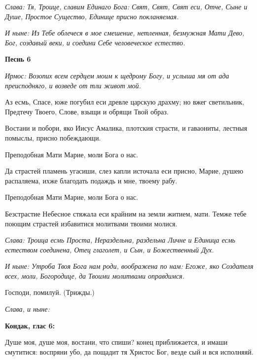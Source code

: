 \itshape Слава\normalfont{}: Тя, Троице, славим Единаго Бога: Свят, Свят, Свят еси, Отче, Сыне и Душе, Простое Существо, Единице присно покланяемая. 

\itshape И ныне\normalfont{}: Из Тебе облечеся в мое смешение, нетленная, безмужная Мати Дево, Бог, создавый веки, и соедини Себе человеческое естество.


\medskip


\bfseries Песнь 6\normalfont{}

\itshape Ирмос\normalfont{}: Возопих всем сердцем моим к щедрому Богу, и услыша мя от ада преисподняго, и возведе от тли живот мой. 

Аз есмь, Спасе, юже погубил еси древле царскую драхму; но вжег светильник, Предтечу Твоего, Слове, взыщи и обрящи Твой образ. 

Востани и побори, яко Иисус Амалика, плотския страсти, и гаваониты, лестныя помыслы, присно побеждающи. 

\bfseries 

Преподобная Мати Марие, моли Бога о нас.

\normalfont{}

Да страстей пламень угасиши, слез капли источала еси присно, Марие, душею распаляема, ихже благодать подаждь и мне, твоему рабу. 

\bfseries 

Преподобная Мати Марие, моли Бога о нас.

\normalfont{}

Безстрастие Небесное стяжала еси крайним на земли житием, мати. Темже тебе поющим страстей избавитися молитвами твоими молися. 

\itshape Слава\normalfont{}: Троица есмь Проста, Нераздельна, раздельна Личне и Единица есмь естеством соединена, Отец глаголет, и Сын, и Божественный Дух. 

\itshape И ныне\normalfont{}: Утроба Твоя Бога нам роди, воображена по нам: Егоже, яко Создателя всех, моли, Богородице, да Твоими молитвами оправдимся. 

Господи, помилуй. (Трижды.) 

\itshape Слава, и ныне\normalfont{}:


\medskip


\bfseries Кондак, глас 6:\normalfont{}

Душе моя, душе моя, востани, что спиши? конец приближается, и имаши смутитися: воспряни убо, да пощадит тя Христос Бог, везде сый и вся исполняяй.


\medskip


